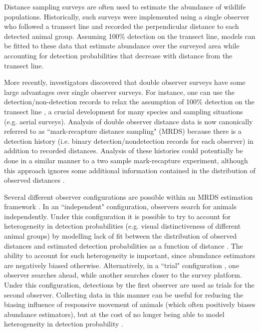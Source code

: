 \documentclass[12pt,fleqn]{article}
\begin{document}
Distance sampling surveys \citep{BurnhamEtAl1980,BucklandEtAl2001} are often used to estimate the abundance of wildlife populations.  Historically, such surveys were implemented using a single observer who followed a transect line and recorded the perpendicular distance to each detected animal group.  Assuming 100\% detection on the transect line, models can be fitted to these data that estimate abundance over the surveyed area while accounting for detection probabilities that decrease with distance from the transect line.

More recently, investigators discovered that double observer surveys have some large advantages over single observer surveys.  For instance, one can use the detection/non-detection records to relax the assumption of 100\% detection on the transect line \citep{BorchersEtAl1998}, a crucial development for many species and sampling situations (e.g. aerial surveys).  Analysis of double observer distance data is now canonically referred to as ``mark-recapture distance sampling" (MRDS) because there is a detection history (i.e. binary detection/nondetection records for each observer) in addition to recorded distances. Analysis of these histories could potentially be done in a similar manner to a two sample mark-recapture experiment, although this approach ignores some additional information contained in the distribution of observed distances \citep{LaakeBorchers2004}.

Several different observer configurations are possible within an MRDS estimation framework \citep{BurtEtAl2014}.  In an ``independent" configuration, observers search for animals independently.  Under this configuration it is possible to try to account for heterogeneity in detection probabilities (e.g. visual distinctiveness of different animal groups) by modelling lack of fit between the distribution of observed distances and estimated detection probabilities as a function of distance \citep{LaakeBorchers2004,BorchersEtAl2006,BucklandEtAl2010}.  The ability to account for such heterogeneity is important, since abundance estimators are negatively biased otherwise. Alternatively, in a ``trial" configuration \citep{LaakeBorchers2004}, one observer searches ahead, while another searches closer to the survey platform.  Under this configuration, detections by the first observer are used as trials for the second observer.  Collecting data in this manner can be useful for reducing the biasing influence of responsive movement of animals (which often positively biases abundance estimators), but at the cost of no longer being able to model heterogeneity in detection probability \citep{BurtEtAl2014}.
\end{document}
